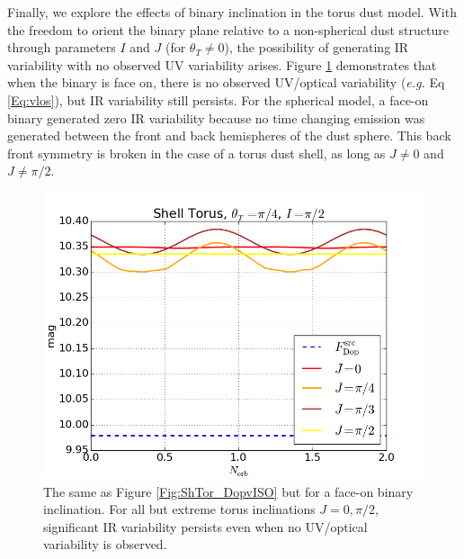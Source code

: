 Finally, we explore the effects of binary inclination in the torus dust model.
With the freedom to orient the binary plane relative to a non-spherical dust
structure through parameters $I$ and $J$ (for $\theta_T \neq 0$), the
possibility of generating IR variability with no observed UV variability
arises. Figure \ref{Fig:ShTor_VarI} demonstrates that when the binary is
face on, there is no observed UV/optical variability (\textit{e.g.} Eq
\ref{Eq:vlos}), but IR variability still persists. For the spherical model,
a face-on binary generated zero IR variability because no time
changing emission was generated between the front and back hemispheres of the dust sphere.
This back front symmetry is broken in the case of a torus dust shell, as
long as $J\neq 0$ and $J\neq \pi/2$.




\begin{figure}
\begin{center}
\includegraphics[scale=0.33]{figures/ch5/ShTor_Thin/FDop_ShTor_Thin_nrm0__Rin2p73218e+18_Inc1p5708_thetaT0p785398_VaryJ_numin0_numx6} 
\end{center}
%
\caption{The same as Figure \ref{Fig:ShTor_DopvISO} but for a face-on binary
inclination. For all but extreme torus inclinations $J=0, \pi/2$,
significant IR variability persists even when no UV/optical variability is
observed.}
%
\label{Fig:ShTor_VarI}
\end{figure}














